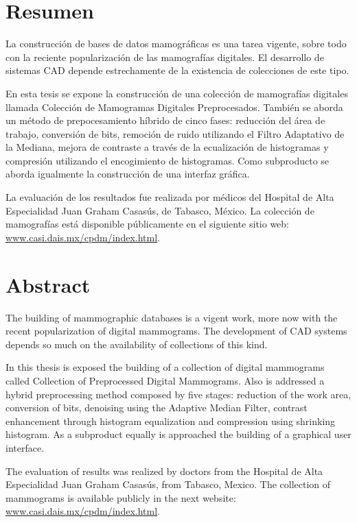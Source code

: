 \newpage 
{}
\chapter*{Resumen}

La construcción de bases de datos mamográficas es una tarea vigente, sobre todo
con la reciente popularización de las mamografías digitales. El desarrollo de
sistemas CAD depende estrechamente de la existencia de colecciones de este
tipo. 

En esta tesis se expone la construcción de una colección de mamografías
digitales llamada Colección de Mamogramas Digitales Preprocesados. También se
aborda un método de prepocesamiento híbrido de cinco fases: reducción del área
de trabajo, conversión de bits, remoción de ruido utilizando el Filtro
Adaptativo de la Mediana, mejora de contraste a través de la ecualización de
histogramas y compresión utilizando el encogimiento de histogramas. Como
subproducto se aborda igualmente la construcción de una interfaz gráfica.

La evaluación de los resultados fue realizada por médicos del Hospital de Alta
Especialidad Juan Graham Casasús, de Tabasco, México. La colección de
mamografías está disponible públicamente en el siguiente sitio web:
\url{www.casi.dais.mx/cpdm/index.html}. 

\newpage 
{}
\chapter*{Abstract}

The building of mammographic databases is a vigent work, more now with the
recent popularization of digital mammograms. The development of CAD systems
depends so much on the availability of collections of this kind.

In this thesis is exposed the building of a collection of digital mammograms
called Collection of Preprocessed Digital Mammograms. Also is addressed a
hybrid preprocessing method composed by five stages: reduction of the work
area, conversion of bits, denoising using the Adaptive Median Filter, contrast
enhancement through histogram equalization and compression using shrinking
histogram. As a subproduct equally is approached the building of a graphical
user interface.

The evaluation of results was realized by doctors from the Hospital de Alta
Especialidad Juan Graham Casasús, from Tabasco, Mexico. The collection of
mammograms is available publicly in the next website:
\url{www.casi.dais.mx/cpdm/index.html}. 
